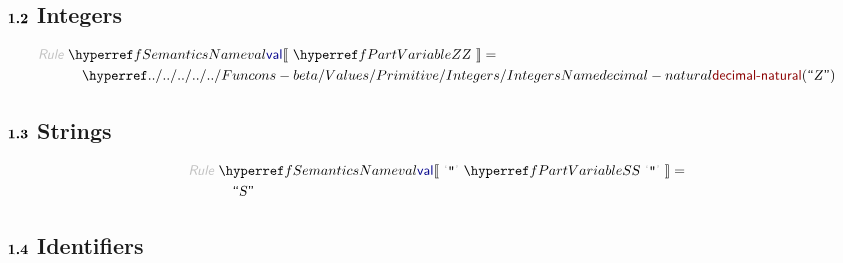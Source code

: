 \subsection*{$\SECT{1.2}$ Integers}\hypertarget{sect12-integers}{}\label{sect12-integers}

\begin{align*}
  \KEY{Rule} ~ 
    & \SEMREF{val} \LEFTPHRASE ~ \VARREF{Z} ~ \RIGHTPHRASE  = \\&\quad
      \NAMEHYPER{../../../../../Funcons-beta/Values/Primitive}{Integers}{decimal-natural}
        ( \textsf{\textquotedblleft}\VAR{Z}\textsf{\textquotedblright} )
\end{align*}
\subsection*{$\SECT{1.3}$ Strings}\hypertarget{sect13-strings}{}\label{sect13-strings}

\begin{align*}
  \KEY{Rule} ~ 
    & \SEMREF{val} \LEFTPHRASE ~ \LEX{"{}} ~ \VARREF{S} ~ \LEX{"{}} ~ \RIGHTPHRASE  = \\&\quad
      \textsf{\textquotedblleft}\VAR{S}\textsf{\textquotedblright}
\end{align*}
\subsection*{$\SECT{1.4}$ Identifiers}\hypertarget{sect14-identifiers}{}\label{sect14-identifiers}


